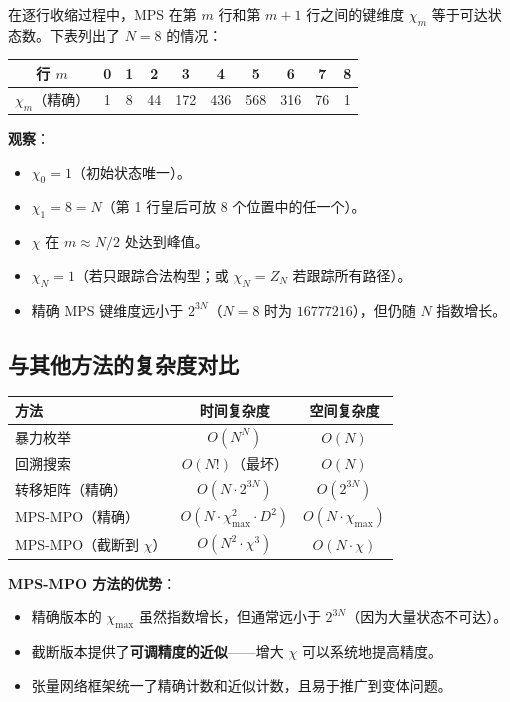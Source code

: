 \documentclass[12pt,a4paper]{ctexart}
\begin{document}
在逐行收缩过程中，MPS 在第 $m$ 行和第 $m+1$ 行之间的键维度 $\chi_m$ 等于可达状态数。下表列出了 $N = 8$ 的情况：

\begin{center}
\renewcommand{\arraystretch}{1.2}
\begin{tabular}{c|ccccccccc}
\hline
行 $m$ & 0 & 1 & 2 & 3 & 4 & 5 & 6 & 7 & 8 \\
\hline
$\chi_m$（精确） & 1 & 8 & 44 & 172 & 436 & 568 & 316 & 76 & 1 \\
\hline
\end{tabular}
\end{center}

\textbf{观察}：
\begin{itemize}
    \item $\chi_0 = 1$（初始状态唯一）。
    \item $\chi_1 = 8 = N$（第 1 行皇后可放 8 个位置中的任一个）。
    \item $\chi$ 在 $m \approx N/2$ 处达到峰值。
    \item $\chi_N = 1$（若只跟踪合法构型；或 $\chi_N = Z_N$ 若跟踪所有路径）。
    \item 精确 MPS 键维度远小于 $2^{3N}$（$N=8$ 时为 $16777216$），但仍随 $N$ 指数增长。
\end{itemize}

\subsection{与其他方法的复杂度对比}

\begin{center}
\renewcommand{\arraystretch}{1.3}
\begin{tabular}{lcc}
\hline
\textbf{方法} & \textbf{时间复杂度} & \textbf{空间复杂度} \\
\hline
暴力枚举 & $O(N^N)$ & $O(N)$ \\
回溯搜索 & $O(N!)$（最坏） & $O(N)$ \\
转移矩阵（精确） & $O(N \cdot 2^{3N})$ & $O(2^{3N})$ \\
MPS-MPO（精确） & $O(N \cdot \chi_{\max}^2 \cdot D^2)$ & $O(N \cdot \chi_{\max})$ \\
MPS-MPO（截断到 $\chi$） & $O(N^2 \cdot \chi^3)$ & $O(N \cdot \chi)$ \\
\hline
\end{tabular}
\end{center}

\textbf{MPS-MPO 方法的优势}：
\begin{itemize}
    \item 精确版本的 $\chi_{\max}$ 虽然指数增长，但通常远小于 $2^{3N}$（因为大量状态不可达）。
    \item 截断版本提供了\textbf{可调精度的近似}——增大 $\chi$ 可以系统地提高精度。
    \item 张量网络框架统一了精确计数和近似计数，且易于推广到变体问题。
\end{itemize}
\end{document}
